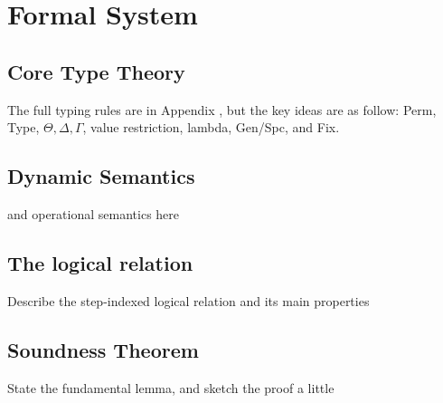 \section{Formal System}\label{sec:formal_system}

\subsection{Core Type Theory}

The full typing rules are in Appendix \label{subsec:static_sem}, but the key
ideas are as follow: \textsf{Perm}, \textsf{Type}, $\Theta, \Delta, \Gamma$,
value restriction, lambda, Gen/Spc, and Fix.

\subsection{Dynamic Semantics}\label{subsec:semantics}

and operational semantics here

\subsection{The logical relation}

Describe the step-indexed logical relation and its main properties 

\subsection{Soundness Theorem}

State the fundamental lemma, and sketch the proof a little

